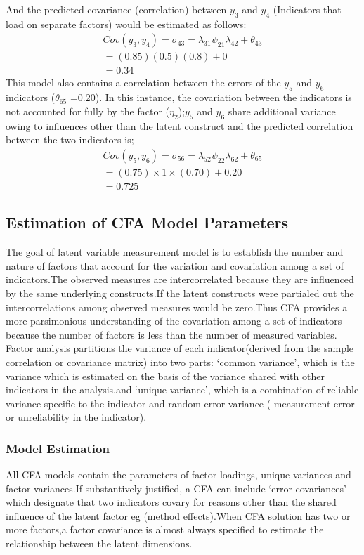 \documentclass[12pt]{article}
\begin{document}
And the predicted covariance (correlation) between $y_3$ and $y_4$ (Indicators that load on separate factors) would be estimated as follows:
\begin{align*}
	Cov(y_3,y_4)=\sigma_{43}= \lambda_{31}\psi_{21}\lambda_{42}+\theta_{43}\\
	=(0.85)(0.5)(0.8)+0\\
	=0.34
\end{align*}
This model also contains a correlation between the errors of the $y_5$ and $y_6$ indicators ($\theta_{65}$ =0.20). In this instance, the covariation between the indicators is not accounted for fully by the factor ($\eta_2$);$y_5$ and $y_6$ share additional variance owing to influences other than the latent construct and the predicted correlation between the two indicators is;
\begin{align*}
	Cov(y_5,y_6)=\sigma_{56}=\lambda_{52}\psi_{22}\lambda_{62}+\theta_{65}\\
	=(0.75)\times1\times(0.70)+0.20\\
	=0.725
\end{align*}
\subsection{Estimation of CFA Model Parameters}
The goal of latent variable measurement model is to establish the number and nature of factors that account for the variation and covariation among a set of indicators.The observed measures are intercorrelated because they are influenced by the same underlying constructs.If the latent constructs were partialed out the intercorrelations among observed measures would be zero.Thus CFA provides a more parsimonious understanding of the covariation among a set of indicators because the number of factors is less than the number of measured variables.\\

\noindent Factor analysis partitions the variance of each indicator(derived from the sample correlation or covariance matrix) into two parts: ‘common variance’, which is the variance which is estimated on the basis of the variance shared with other indicators in the analysis.and ‘unique variance’, which is a combination of reliable variance specific to the indicator and random error variance ( measurement error or unreliability in the indicator).


\subsubsection{Model Estimation}
All CFA models contain the parameters of factor loadings, unique variances and factor variances.If substantively justified, a CFA can include ‘error covariances’ which designate that two indicators  covary for reasons other than the shared influence of the latent factor eg (method effects).When CFA solution has two or more factors,a factor covariance is almost always specified to estimate the relationship between the latent dimensions.
\end{document}
